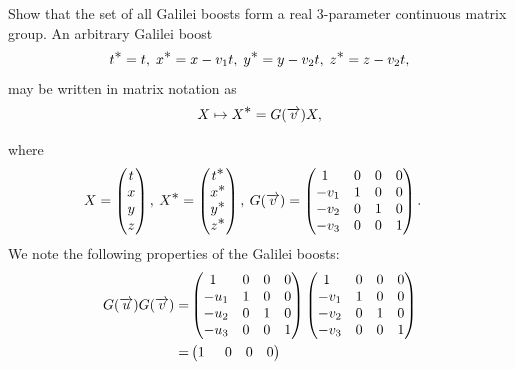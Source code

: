 \exm Show that the set of all Galilei boosts form a real 
3-parameter continuous matrix group.
\prf An arbitrary Galilei boost 
\begin{align*}
 t^{\textstyle \ast}=t,\; x^{\textstyle \ast}=x-v_1t, \; y^{\textstyle \ast}=y-v_2 t, \; 
z^{\textstyle \ast}=z-v_2 t,
\end{align*}
may be written in matrix notation as 
\begin{align}\label{gr.12}
X\mapsto X^{\textstyle \ast} ={G}(\overrightarrow{v})X,
\end{align}
\begin{small}
where
\begin{align}\label{gr.13}
 X&=\begin{pmatrix} t \\x\\y\\z
\end{pmatrix},
\:X^\bst =\begin{pmatrix} t^\bst
\\x^\bst \\y^\bst \\z^\bst \end{pmatrix} ,\:
{ G(\vec{v})}
=\begin{pmatrix} 1\ph{_2}&0&0&0\\
-v_1&1&0&0\\
-v_2&0&1&0\\
-v_3&0&0&1\\
\end{pmatrix}.
\end{align}
We note the following properties of the Galilei boosts:
\begin{align}
{G(\vec{u})}{G(\vec{v})}=&\begin{pmatrix}
1\ph{_2}&0&0&0\\
-u_1&1&0&0\\
-u_2&0&1&0\\
-u_3&0&0&1\\
\end{pmatrix}
\begin{pmatrix}
1\ph{_2}&0&0&0\\
-v_1&1&0&0\\
-v_2&0&1&0\\
-v_3&0&0&1\\
\end{pmatrix}\notag\\
=&\begin{pmatrix}\label{gr.14}
1\ph{_2} &0&0&0\\

\end{pmatrix}
\end{align}
\end{small}
